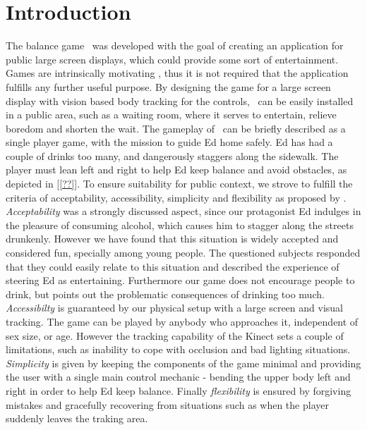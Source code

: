 \documentclass{chi-ext}
\begin{document}
\section{Introduction}
The balance game \drunkened\ was developed with the goal of creating an application for public large screen displays, which could provide some sort of entertainment. Games are intrinsically motivating \cite{salen2004rules} \cite{malone1981motivation}, thus it is not required that the application fulfills any further useful purpose. By designing the game for a large screen display with vision based body tracking for the controls, \drunkened\ can be easily installed in a public area, such as a waiting room, where it serves to entertain, relieve boredom and shorten the wait.
The gameplay of \drunkened\ can be briefly described as a single player game, with the mission to guide Ed home safely. Ed has had a couple of drinks too many, and dangerously staggers along the sidewalk. The player must lean left and right to help Ed keep balance and avoid obstacles, as depicted in [\ref{??}].
To ensure suitability for public context, we strove to fulfill the criteria of acceptability, accessibility, simplicity and flexibility as proposed by \cite{kultima2009casual}. \textit{Acceptability} was a strongly discussed aspect, since our protagonist Ed indulges in the pleasure of consuming alcohol, which causes him to stagger along the streets drunkenly. However we have found that this situation is widely accepted and considered fun, specially among young people. The questioned subjects responded that they could easily relate to this situation and described the experience of steering Ed as entertaining. Furthermore our game does not encourage people to drink, but points out the problematic consequences of drinking too much. \textit{Accessibilty} is guaranteed by our physical setup with a large screen and visual tracking. The game can be played by anybody who approaches it, independent of sex size, or age. However the tracking capability of the Kinect sets a couple of limitations, such as inability to cope with occlusion and bad lighting situations. \textit{Simplicity} is given by keeping the components of the game minimal and providing the user with a single main control mechanic - bending the upper body left and right in order to help Ed keep balance. Finally \textit{flexibility} is ensured by forgiving mistakes and gracefully recovering from situations such as when the player suddenly leaves the traking area.
\end{document}
